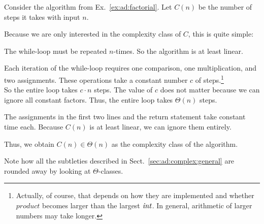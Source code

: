 \begin{example}\label{ex:ad:factorial:complex}
Consider the algorithm from Ex.~\ref{ex:ad:factorial}.
Let $C(n)$ be the number of steps it takes with input $n$.

Because we are only interested in the complexity class of $C$, this is quite simple:
\begin{compactenum}
\item The while-loop must be repeated $n$-times. So the algorithm is at least linear.
\item Each iteration of the while-loop requires one comparison, one multiplication, and two assignments.
 These operations take a constant number $c$ of steps.\footnote{Actually, of course, that depends on how they are implemented and whether $product$ becomes larger than the largest $\mathit{int}$. In general, arithmetic of larger numbers may take longer.}\\
 So the entire loop takes $c\cdot n$ steps. The value of $c$ does not matter because we can ignore all constant factors. Thus, the entire loop takes $\Theta(n)$ steps.
\item The assignments in the first two lines and the return statement take constant time each.
Because $C(n)$ is at least linear, we can ignore them entirely.
\item Thus, we obtain $C(n)\in \Theta(n)$ as the complexity class of the algorithm.
\end{compactenum}
\end{example}

Note how all the subtleties described in Sect.~\ref{sec:ad:complex:general} are rounded away by looking at $\Theta$-classes.
\medskip

